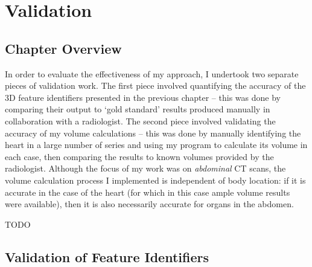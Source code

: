 \chapter{Validation}
\label{chap:validation}

\section{Chapter Overview}


In order to evaluate the effectiveness of my approach, I undertook two separate pieces of validation work. The first piece involved quantifying the accuracy of the 3D feature identifiers presented in the previous chapter -- this was done by comparing their output to `gold standard' results produced manually in collaboration with a radiologist. The second piece involved validating the accuracy of my volume calculations -- this was done by manually identifying the heart in a large number of series and using my program to calculate its volume in each case, then comparing the results to known volumes provided by the radiologist. Although the focus of my work was on \emph{abdominal} CT scans, the volume calculation process I implemented is independent of body location: if it is accurate in the case of the heart (for which in this case ample volume results were available), then it is also necessarily accurate for organs in the abdomen.

TODO

\section{Validation of Feature Identifiers}

